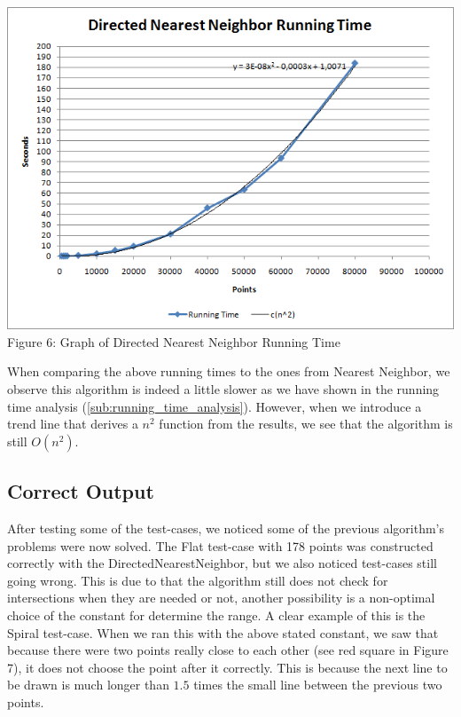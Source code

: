         \begin{center}
        \includegraphics[scale = 0.6]{2DirectedNearestNeighbor/dnnRuntimeGraph.png}\\
        Figure 6: Graph of Directed Nearest Neighbor Running Time
        \end{center}

        \noindent When comparing the above running times to the ones from Nearest Neighbor, we observe this algorithm is indeed a little slower as we have shown in the running time analysis (\ref{sub:running_time_analysis}). However, when we introduce a trend line that derives a $n^2$ function from the results, we see that the algorithm is still $O(n^2)$.\\

        \subsection{Correct Output}
        After testing some of the test-cases, we noticed some of the previous algorithm's problems were now solved. The Flat test-case with 178 points was constructed correctly with the DirectedNearestNeighbor, but we also noticed test-cases still going wrong.
        This is due to that the algorithm still does not check for intersections when they are needed or not, another possibility is a non-optimal choice of the constant for determine the range. A clear example of this is the Spiral test-case. When we ran this with the above stated constant, we saw that because there were two points really close to each other (see red square in Figure 7), it does not choose the point after it correctly. This is because the next line to be drawn is much longer than $1.5$ times the small line between the previous two points.\\

